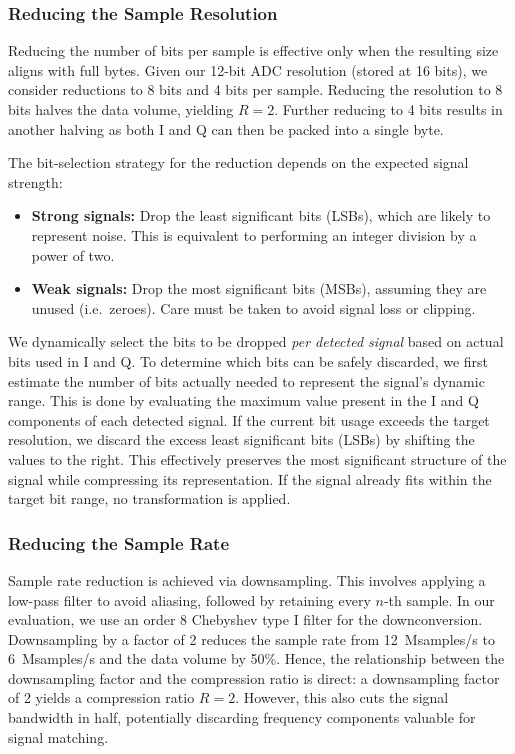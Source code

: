 \documentclass[sigconf, 10pt, nonacm, anonymous]{acmart}  %
\begin{document}
\subsubsection{Reducing the Sample Resolution}

Reducing the number of bits per sample is effective only when the resulting
size aligns with full bytes. Given our 12-bit ADC resolution (stored at 16 bits), we consider
reductions to 8 bits and 4 bits per sample. Reducing the resolution to 8 bits halves the data volume, yielding $R = 2$. Further reducing to 4 bits results in another halving as both I and Q can then be packed into a single byte.

The bit-selection strategy for the reduction depends on the expected signal strength:
\begin{itemize}
    \item \textbf{Strong signals:} Drop the least significant bits (LSBs), which
          are likely to represent noise. This is equivalent to performing an
          integer division by a power of two.
    \item \textbf{Weak signals:} Drop the most significant bits (MSBs),
          assuming they are unused (i.e.\ zeroes). Care must be taken to avoid
          signal loss or clipping.
\end{itemize}

We dynamically select the bits to be dropped \emph{per detected signal} based
on actual bits used in I and Q. To determine which bits can be safely discarded, we first estimate the number of bits actually needed to represent the signal's dynamic range. This is done by evaluating the maximum value present in the I and Q components of each detected signal. If the current bit usage exceeds the target resolution, we discard the excess least significant bits (LSBs) by shifting the values to the right. This effectively preserves the most significant structure of the signal while compressing its representation. If the signal already fits within the target bit range, no transformation is applied.

\subsubsection{Reducing the Sample Rate}

Sample rate reduction is achieved via downsampling. This involves applying a low-pass filter to avoid aliasing, followed by retaining every $n$-th sample. In our evaluation, we use an order 8 Chebyshev type I filter for the downconversion. Downsampling by a factor of 2 reduces the sample rate from 12~Msamples/s to 6~Msamples/s and the data volume by 50\%. Hence, the relationship between the downsampling factor and the compression ratio is direct: a downsampling factor of 2 yields a compression ratio $R = 2$. However, this also cuts the signal bandwidth in half, potentially discarding frequency components valuable for signal matching.
\end{document}
